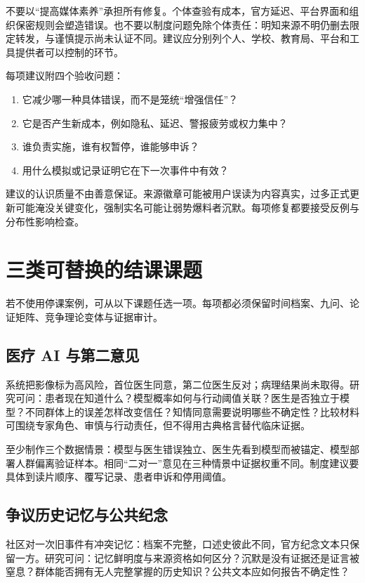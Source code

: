 不要以“提高媒体素养”承担所有修复。个体查验有成本，官方延迟、平台界面和组织保密规则会塑造错误。也不要以制度问题免除个体责任：明知来源不明仍删去限定转发，与谨慎提示尚未认证不同。建议应分别列个人、学校、教育局、平台和工具提供者可以控制的环节。

每项建议附四个验收问题：

\begin{enumerate}
\item 它减少哪一种具体错误，而不是笼统“增强信任”？
\item 它是否产生新成本，例如隐私、延迟、警报疲劳或权力集中？
\item 谁负责实施，谁有权暂停，谁能够申诉？
\item 用什么模拟或记录证明它在下一次事件中有效？
\end{enumerate}

建议的认识质量不由善意保证。来源徽章可能被用户误读为内容真实，过多正式更新可能淹没关键变化，强制实名可能让弱势爆料者沉默。每项修复都要接受反例与分布性影响检查。

\section{三类可替换的结课课题}

若不使用停课案例，可从以下课题任选一项。每项都必须保留时间档案、九问、论证矩阵、竞争理论变体与证据审计。

\subsection{医疗 AI 与第二意见}

系统把影像标为高风险，首位医生同意，第二位医生反对；病理结果尚未取得。研究可问：患者现在知道什么？模型概率如何与行动阈值关联？医生是否独立于模型？不同群体上的误差怎样改变信任？知情同意需要说明哪些不确定性？比较材料可围绕专家角色、审慎与行动责任，但不得用古典格言替代临床证据。

至少制作三个数据情景：模型与医生错误独立、医生先看到模型而被锚定、模型部署人群偏离验证样本。相同“二对一”意见在三种情景中证据权重不同。制度建议要具体到读片顺序、覆写记录、患者申诉和停用阈值。

\subsection{争议历史记忆与公共纪念}

社区对一次旧事件有冲突记忆：档案不完整，口述史彼此不同，官方纪念文本只保留一方。研究可问：记忆鲜明度与来源资格如何区分？沉默是没有证据还是证言被窒息？群体能否拥有无人完整掌握的历史知识？公共文本应如何报告不确定性？

